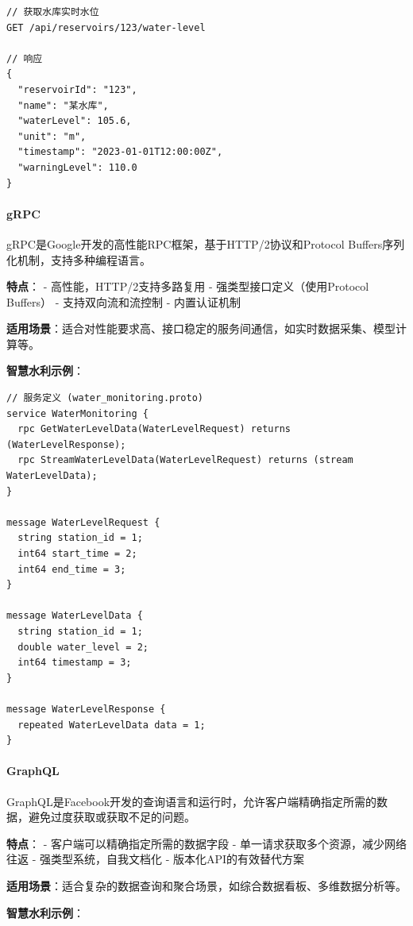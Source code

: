 \begin{lstlisting}
// 获取水库实时水位
GET /api/reservoirs/123/water-level

// 响应
{
  "reservoirId": "123",
  "name": "某水库",
  "waterLevel": 105.6,
  "unit": "m",
  "timestamp": "2023-01-01T12:00:00Z",
  "warningLevel": 110.0
}
\end{lstlisting}

\paragraph{gRPC}\label{grpc}

gRPC是Google开发的高性能RPC框架，基于HTTP/2协议和Protocol
Buffers序列化机制，支持多种编程语言。

\textbf{特点}： - 高性能，HTTP/2支持多路复用 -
强类型接口定义（使用Protocol Buffers） - 支持双向流和流控制 -
内置认证机制

\textbf{适用场景}：适合对性能要求高、接口稳定的服务间通信，如实时数据采集、模型计算等。

\textbf{智慧水利示例}：

\begin{lstlisting}
// 服务定义 (water_monitoring.proto)
service WaterMonitoring {
  rpc GetWaterLevelData(WaterLevelRequest) returns (WaterLevelResponse);
  rpc StreamWaterLevelData(WaterLevelRequest) returns (stream WaterLevelData);
}

message WaterLevelRequest {
  string station_id = 1;
  int64 start_time = 2;
  int64 end_time = 3;
}

message WaterLevelData {
  string station_id = 1;
  double water_level = 2;
  int64 timestamp = 3;
}

message WaterLevelResponse {
  repeated WaterLevelData data = 1;
}
\end{lstlisting}

\paragraph{GraphQL}\label{graphql}

GraphQL是Facebook开发的查询语言和运行时，允许客户端精确指定所需的数据，避免过度获取或获取不足的问题。

\textbf{特点}： - 客户端可以精确指定所需的数据字段 -
单一请求获取多个资源，减少网络往返 - 强类型系统，自我文档化 -
版本化API的有效替代方案

\textbf{适用场景}：适合复杂的数据查询和聚合场景，如综合数据看板、多维数据分析等。

\textbf{智慧水利示例}：

